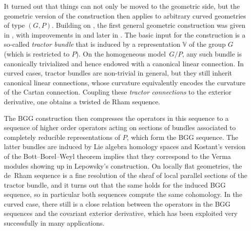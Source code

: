 \documentclass[pdftex]{sigma}
\numberwithin{equation}{section}
\def\Bbb{\mathbb}
\begin{document}
It turned out that things can not only be moved to the geometric side, but the
geometric version of the construction then applies to arbitrary curved geometries of
type $(G,P)$. Building on \cite{Baston}, the first general geometric construction was
given in \cite{CSS-BGG}, with improvements in \cite{Calderbank-Diemer} and later in
\cite{Rel-BGG2}. The basic input for the construction is a so-called \textit{tractor
 bundle} that is induced by a representation $\Bbb V$ of the group $G$ (which is
restricted to $P$). On the homogeneous model~$G/P$, any such bundle is canonically
trivialized and hence endowed with a canonical linear connection. In curved cases,
tractor bundles are non-trivial in general, but they still inherit canonical
linear connections, whose curvature equivalently encodes the curvature of the Cartan
connection. Coupling these \textit{tractor connections} to the exterior derivative,
one obtains a twisted de Rham sequence.

The BGG construction then compresses the operators in this sequence to a sequence of
higher order operators acting on sections of bundles associated to completely
reducible representations of $P$, which form the BGG sequence. The latter bundles are
induced by Lie algebra homology spaces and Kostant's version of the Bott--Borel--Weyl
theorem \cite{Kostant} implies that they correspond to the Verma modules showing up
in Lepowsky's construction. On locally flat geometries, the de~Rham sequence is a
fine resolution of the sheaf of local parallel sections of the tractor bundle, and it
turns out that the same holds for the induced BGG sequence, so in particular both
sequences compute the same cohomology. In the curved case, there still is a close
relation between the operators in the BGG sequences and the covariant exterior
derivative, which has been exploited very successfully in many applications.
\end{document}
